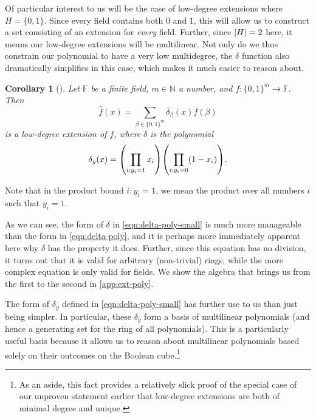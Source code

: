 \documentclass[english]{reedthesis}
\theoremstyle{plain}
\newtheorem{cor}[cor]{Corollary}
\theoremstyle{definition}
\theoremstyle{remark}
\DeclarePairedDelimiter{\abs}{\lvert}{\rvert}
\begin{document}
Of particular interest to us will be the case of low-degree extensions where
$H = \{0, 1\}$. Since every field contains both $0$ and $1$, this will allow us
to construct a set consisting of an extension for \emph{every} field. Further,
since $\abs{H} = 2$ here, it means our low-degree extensions will be
multilinear. Not only do we thus constrain our polynomial to have a very low
multidegree, the $\delta$ function also dramatically simplifies in this case, which
makes it much easier to reason about.

\begin{cor}[{\cite[]{AW09}}]\label{cor:low-degree-boolean}
  Let $\mathbb{F}$ be a finite field, $m \in \mathbb{N}$ a number, and
  $f: \{0, 1\}^{m} \rightarrow \mathbb{F}$. Then
  \begin{equation}\label{eqn:low-deg-ext-small}
    \hat{f}(x) = \sum_{\beta \in \{0, 1\}^{m}}\delta_{\beta}(x)f(\beta)
  \end{equation}
  is a low-degree extension of $f$, where $\delta$ is the polynomial
  \begin{equation}\label{eqn:delta-poly-small}
    \delta_{y}(x) = \mleft(\prod_{i:y_{i}=1}x_{i}\mright)\mleft(\prod_{i:y_{i}=0}(1 - x_{i})\mright).
  \end{equation}
\end{cor}
Note that in the product bound $i:y_{i} = 1$, we mean the product over all
numbers $i$ such that $y_{i} = 1$.

As we can see, the form of $\delta$ in \cref{eqn:delta-poly-small} is much more
manageable than the form in \cref{eqn:delta-poly}, and it is perhaps more
immediately apparent here why $\delta$ has the property it does. Further, since this
equation has no division, it turns out that it is valid for arbitrary
(non-trivial) rings, while the more complex equation is only valid for fields.
We show the algebra that brings us from the first to the second in
\cref{app:ext-poly}.

The form of $\delta_{y}$ defined in \cref{eqn:delta-poly-small} has further use to us
than just being simpler. In particular, these $\delta_{y}$ form a basis of
multilinear polynomials (and hence a generating set for the ring of all
polynomials). This is a particularly useful basis because it allows us to reason
about multilinear polynomials based solely on their outcomes on the Boolean
cube.\footnote{As an aside, this fact provides a relatively slick proof of the
  special case of our unproven statement earlier that low-degree extensions are
  both of minimal degree and unique.}
\end{document}
